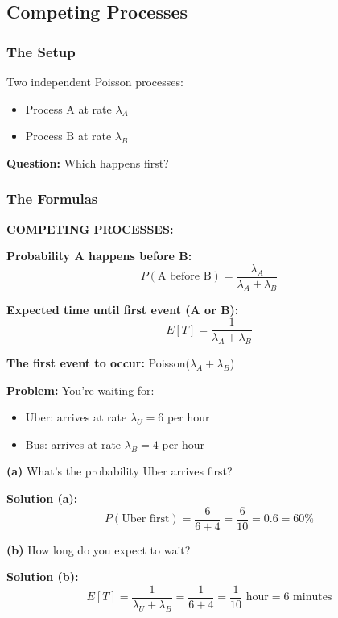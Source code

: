 \documentclass[10pt,letterpaper]{article}
\begin{document}
\subsection{Competing Processes}

\subsubsection{The Setup}

Two independent Poisson processes:
\begin{itemize}
  \item Process A at rate $\lambda_A$
  \item Process B at rate $\lambda_B$
\end{itemize}

\textbf{Question:} Which happens first?

\subsubsection{The Formulas}

\begin{formulabox}
\textbf{COMPETING PROCESSES:}

\vspace{0.2cm}

\textbf{Probability A happens before B:}
\[
P(\text{A before B}) = \frac{\lambda_A}{\lambda_A + \lambda_B}
\]

\textbf{Expected time until first event (A or B):}
\[
E[T] = \frac{1}{\lambda_A + \lambda_B}
\]

\textbf{The first event to occur:} Poisson($\lambda_A + \lambda_B$)
\end{formulabox}

\begin{examplebox}
\textbf{Problem:} You're waiting for:
\begin{itemize}
  \item Uber: arrives at rate $\lambda_U = 6$ per hour
  \item Bus: arrives at rate $\lambda_B = 4$ per hour
\end{itemize}

\textbf{(a)} What's the probability Uber arrives first?

\textbf{Solution (a):}
\[
P(\text{Uber first}) = \frac{6}{6+4} = \frac{6}{10} = \boxed{0.6 = 60\%}
\]

\textbf{(b)} How long do you expect to wait?

\textbf{Solution (b):}
\[
E[T] = \frac{1}{\lambda_U + \lambda_B} = \frac{1}{6+4} = \frac{1}{10} \text{ hour} = \boxed{6 \text{ minutes}}
\]
\end{examplebox}
\end{document}
